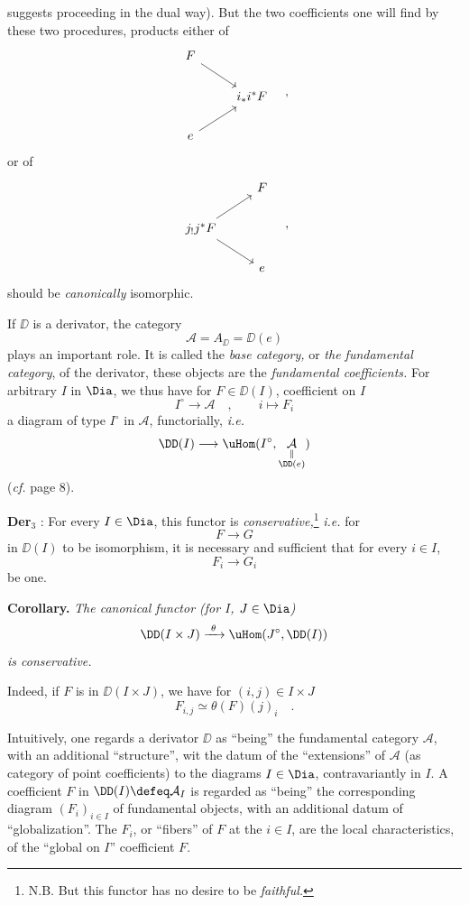 \noindent suggests proceeding in the dual way). But the two coefficients one will find by these two procedures, products either of
\[
\begin{tikzcd}
F \arrow[dr] & \\
 & i_*i^*F \\
e \arrow[ur] &
\end{tikzcd}
\quad ,
\]
or of
\[
\begin{tikzcd}
 & F \\
j_!j^*F \arrow[ur] \arrow[dr] & \\
 & e
\end{tikzcd}
\quad ,
\]
should be \textit{canonically} isomorphic.

\noindent{}If $\DD$ is a derivator, the category
\[
\mathcal{A} = A_{\DD} = \DD(e) %
\]
plays an important role. It is called the \textit{base category,} or \textit{the fundamental category}, of the derivator, these objects are the \textit{fundamental coefficients.} For arbitrary $I$ in $\Dia$, we thus have for $F \in \DD(I)$, coefficient on $I$ %
\[
I^\circ \longrightarrow \mathcal{A} \quad , \qquad i \longmapsto F_i
\]
a diagram of type $I^\circ$ in $\mathcal{A}$, functorially, \textit{i.e.}
\[
\DD(I)\longrightarrow
\uHom(I^\circ,\underset{\substack{\Vert\\\DD(e)}}{\mathcal A})
\]
(\textit{cf.} page 8).

\noindent\textbf{Der}$_3$ : For every $I \in \Dia$, this functor is \textit{conservative,}\footnote[4]{N.B. But this functor has no desire to be \textit{faithful.}} \textit{i.e.} for
\[
F \longrightarrow G
\]
%
in $\DD(I)$ to be isomorphism, it is necessary and sufficient that for every $i \in I$,
\[
F_i \longrightarrow G_i
\]
be one.

\noindent\textbf{Corollary.} \textit{The canonical functor (for $I$, $J \in \Dia$)}
\[
\DD(I \times J) \xrightarrow{\ \theta\ } \uHom(J^\circ, \DD(I))
\]
\textit{is conservative.}

Indeed, if $F$ is in $\DD(I \times J)$, we have for $(i,j) \in I \times J$
\[
F_{i,j} \simeq \theta(F)(j)_i \quad .
\]

\noindent{}Intuitively, one regards a derivator $\DD$ as ``being'' the fundamental category $\mathcal{A}$, with an additional ``structure'', wit the datum of the ``extensions'' of $\mathcal{A}$ (as category of point coefficients) to the diagrams $I \in \Dia$, contravariantly in $I$. A coefficient $F$ in $\DD(I) \defeq \mathcal{A}_I$ is regarded as ``being'' the corresponding diagram $(F_i)_{i\in I}$ of fundamental objects, with an additional datum of ``globalization''. The $F_i$, or ``fibers'' of $F$ at the $i \in I$, are the local characteristics, of the ``global on $I$'' coefficient $F$. %

